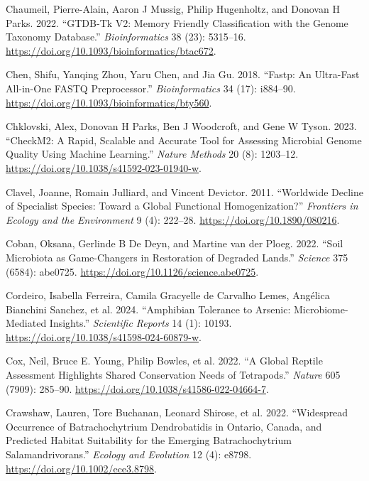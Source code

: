 \documentclass[
  12pt,
]{article}
\newlength{\cslhangindent}
\newenvironment{CSLReferences}[2] %
 {\begin{list}{}{%
  \setlength{\itemindent}{0pt}
  \setlength{\leftmargin}{0pt}
  \setlength{\parsep}{0pt}
  \ifodd #1
   \setlength{\leftmargin}{\cslhangindent}
   \setlength{\itemindent}{-1\cslhangindent}
  \fi
  \setlength{\itemsep}{#2\baselineskip}}}
 {\end{list}}
\begin{document}
\begin{CSLReferences}{1}{1}
Chaumeil, Pierre-Alain, Aaron J Mussig, Philip Hugenholtz, and Donovan H
Parks. 2022. {``{GTDB}-{Tk} V2: Memory Friendly Classification with the
Genome Taxonomy Database.''} \emph{Bioinformatics} 38 (23): 5315--16.
\url{https://doi.org/10.1093/bioinformatics/btac672}.

Chen, Shifu, Yanqing Zhou, Yaru Chen, and Jia Gu. 2018. {``Fastp: An
Ultra-Fast All-in-One {FASTQ} Preprocessor.''} \emph{Bioinformatics} 34
(17): i884--90. \url{https://doi.org/10.1093/bioinformatics/bty560}.

Chklovski, Alex, Donovan H Parks, Ben J Woodcroft, and Gene W Tyson.
2023. {``{CheckM2}: A Rapid, Scalable and Accurate Tool for Assessing
Microbial Genome Quality Using Machine Learning.''} \emph{Nature
Methods} 20 (8): 1203--12.
\url{https://doi.org/10.1038/s41592-023-01940-w}.

Clavel, Joanne, Romain Julliard, and Vincent Devictor. 2011.
{``Worldwide Decline of Specialist Species: Toward a Global Functional
Homogenization?''} \emph{Frontiers in Ecology and the Environment} 9
(4): 222--28. \url{https://doi.org/10.1890/080216}.

Coban, Oksana, Gerlinde B De Deyn, and Martine van der Ploeg. 2022.
{``Soil Microbiota as Game-Changers in Restoration of Degraded Lands.''}
\emph{Science} 375 (6584): abe0725.
\url{https://doi.org/10.1126/science.abe0725}.

{Cordeiro, Isabella Ferreira, Camila Gracyelle de Carvalho Lemes,
Angélica Bianchini Sanchez, et al.} 2024. {``Amphibian Tolerance to
Arsenic: Microbiome-Mediated Insights.''} \emph{Scientific Reports} 14
(1): 10193. \url{https://doi.org/10.1038/s41598-024-60879-w}.

Cox, Neil, Bruce E. Young, Philip Bowles, et al. 2022. {``A Global
Reptile Assessment Highlights Shared Conservation Needs of Tetrapods.''}
\emph{Nature} 605 (7909): 285--90.
\url{https://doi.org/10.1038/s41586-022-04664-7}.

Crawshaw, Lauren, Tore Buchanan, Leonard Shirose, et al. 2022.
{``Widespread Occurrence of {Batrachochytrium} Dendrobatidis in
{Ontario}, {Canada}, and Predicted Habitat Suitability for the Emerging
{Batrachochytrium} Salamandrivorans.''} \emph{Ecology and Evolution} 12
(4): e8798. \url{https://doi.org/10.1002/ece3.8798}.


\end{CSLReferences}
\end{document}
